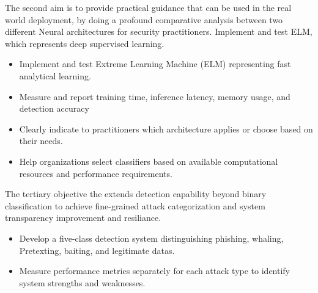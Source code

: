 The second aim is to provide practical guidance that can be used in the real world deployment, by doing a profound comparative analysis between two different
Neural architectures for security practitioners.
Implement and test ELM, which represents deep supervised learning.
\begin{itemize}
    \item Implement and test Extreme Learning Machine (ELM) representing fast analytical learning.
    \item Measure and report training time, inference latency, memory usage, and detection accuracy
    \item Clearly indicate to practitioners which architecture applies or choose based on their needs.
    \item Help organizations select classifiers based on available computational resources and performance requirements.
\end{itemize}
The tertiary objective the  extends detection capability beyond binary classification to achieve fine-grained attack categorization and system transparency improvement and resiliance. 
\begin{itemize}
    \item Develop a five-class detection system distinguishing phishing, whaling, Pretexting, baiting, and legitimate datas. 
    \item Measure performance metrics separately for each attack type to identify system strengths and weaknesses.
\end{itemize}




